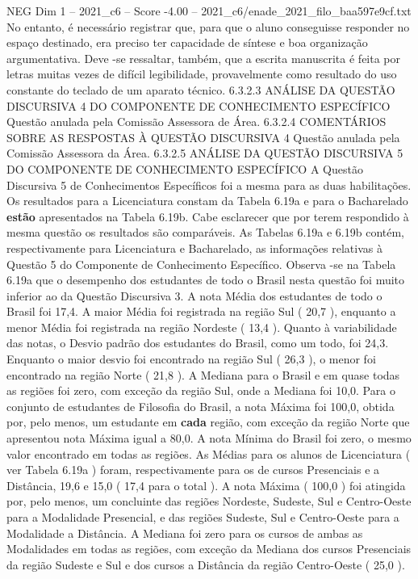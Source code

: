 \begin{textsample}{NEG Dim 1 – 2021\_c6 – Score -4.00 – 2021\_c6/enade\_2021\_filo\_baa597e9cf.txt}
No entanto, é necessário registrar que, para que o aluno conseguisse responder no espaço destinado, era preciso ter capacidade de síntese e boa organização argumentativa.
Deve -se ressaltar, também, que a escrita manuscrita é feita por letras muitas vezes de difícil legibilidade, provavelmente como resultado do uso constante do teclado de um aparato técnico. 6.3.2.3 ANÁLISE DA QUESTÃO DISCURSIVA 4 DO COMPONENTE DE CONHECIMENTO ESPECÍFICO Questão anulada pela Comissão Assessora de Área. 6.3.2.4 COMENTÁRIOS SOBRE AS RESPOSTAS À QUESTÃO DISCURSIVA 4 Questão anulada pela Comissão Assessora da Área. 6.3.2.5 ANÁLISE DA QUESTÃO DISCURSIVA 5 DO COMPONENTE DE CONHECIMENTO ESPECÍFICO A Questão Discursiva 5 de Conhecimentos Específicos foi a mesma para as duas habilitações.
Os resultados para a Licenciatura constam da Tabela 6.19a e para o Bacharelado \textbf{estão} apresentados na Tabela 6.19b.
Cabe esclarecer que por terem respondido à mesma questão os resultados são comparáveis.
As Tabelas 6.19a e 6.19b contém, respectivamente para Licenciatura e Bacharelado, as informações relativas à Questão 5 do Componente de Conhecimento Específico.
Observa -se na Tabela 6.19a que o desempenho dos estudantes de todo o Brasil nesta questão foi muito inferior ao da Questão Discursiva 3.
A nota Média dos estudantes de todo o Brasil foi 17,4.
A maior Média foi registrada na região Sul ( 20,7 ), enquanto a menor Média foi registrada na região Nordeste ( 13,4 ).
Quanto à variabilidade das notas, o Desvio padrão dos estudantes do Brasil, como um todo, foi 24,3.
Enquanto o maior desvio foi encontrado na região Sul ( 26,3 ), o menor foi encontrado na região Norte ( 21,8 ).
A Mediana para o Brasil e em quase todas as regiões foi zero, com exceção da região Sul, onde a Mediana foi 10,0.
Para o conjunto de estudantes de Filosofia do Brasil, a nota Máxima foi 100,0, obtida por, pelo menos, um estudante em \textbf{cada} região, com exceção da região Norte que apresentou nota Máxima igual a 80,0.
A nota Mínima do Brasil foi zero, o mesmo valor encontrado em todas as regiões.
As Médias para os alunos de Licenciatura ( ver Tabela 6.19a ) foram, respectivamente para os de cursos Presenciais e a Distância, 19,6 e 15,0 ( 17,4 para o total ).
A nota Máxima ( 100,0 ) foi atingida por, pelo menos, um concluinte das regiões Nordeste, Sudeste, Sul e Centro-Oeste para a Modalidade Presencial, e das regiões Sudeste, Sul e Centro-Oeste para a Modalidade a Distância.
A Mediana foi zero para os cursos de ambas as Modalidades em todas as regiões, com exceção da Mediana dos cursos Presenciais da região Sudeste e Sul e dos cursos a Distância da região Centro-Oeste ( 25,0 ).

\end{textsample}
